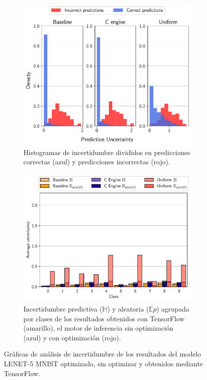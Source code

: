 \begin{figure}[h]
     \centering
     \begin{subfigure}[b]{0.46\textwidth}
         \centering
         \includegraphics[width=\textwidth]{root/Imagenes/opt_software/hist_uncertainty.pdf}
         \caption{Histogramas de incertidumbre divididos en predicciones correctas (azul) y predicciones incorrectas (rojo).\\}
         \label{fig:bad_uncert_hist}
     \end{subfigure}
     \hfill
     \begin{subfigure}[b]{0.51\textwidth}
         \centering
         \includegraphics[width=\textwidth]{root/Imagenes/opt_software/class_uncertainty.pdf}
         \caption{Incertidumbre predictiva ($\mathbb{H}$) y aleatoria ($\mathbb{E}p$) agrupada por clases de los resultados obtenidos con TensorFlow (amarillo), el motor de inferencia sin optimización (azul) y con optimización (rojo).}
         \label{fig:bad_uncert_class}
     \end{subfigure}
     \caption{Gráficas de análisis de incertidumbre de los resultados del modelo LENET-5 MNIST optimizado, sin optimizar y obtenidos mediante TensorFlow.}
     \label{fig:bad_uncert}
\end{figure}
